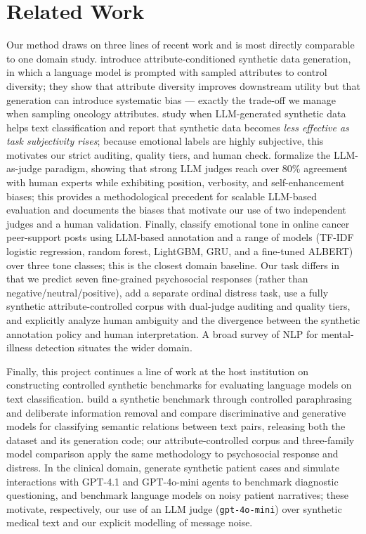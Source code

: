\documentclass[11pt,a4paper]{article}
\begin{document}
\section{Related Work}
Our method draws on three lines of recent work and is most directly comparable to one domain study.
\citet{yu2023} introduce attribute-conditioned synthetic data generation, in which a language model is
prompted with sampled attributes to control diversity; they show that attribute diversity improves
downstream utility but that generation can introduce systematic bias --- exactly the trade-off we
manage when sampling oncology attributes. \citet{li2023} study when LLM-generated synthetic data helps
text classification and report that synthetic data becomes \emph{less effective as task subjectivity
rises}; because emotional labels are highly subjective, this motivates our strict auditing, quality
tiers, and human check. \citet{zheng2023} formalize the LLM-as-judge paradigm, showing that strong LLM
judges reach over 80\% agreement with human experts while exhibiting position, verbosity, and
self-enhancement biases; this provides a methodological precedent for scalable LLM-based evaluation and
documents the biases that motivate our use of two independent judges and a human validation. Finally,
\citet{xu2026} classify emotional tone in online cancer peer-support posts using LLM-based annotation
and a range of models (TF-IDF logistic regression, random forest, LightGBM, GRU, and a fine-tuned
ALBERT) over three tone classes; this is the closest domain baseline. Our task differs in that we
predict seven fine-grained psychosocial responses (rather than negative/neutral/positive), add a
separate ordinal distress task, use a fully synthetic attribute-controlled corpus with dual-judge
auditing and quality tiers, and explicitly analyze human ambiguity and the divergence between the
synthetic annotation policy and human interpretation. A broad survey of NLP for mental-illness
detection \citep{zhang2022} situates the wider domain.

Finally, this project continues a line of work at the host institution on constructing controlled
synthetic benchmarks for evaluating language models on text classification. \citet{apartsin2025str}
build a synthetic benchmark through controlled paraphrasing and deliberate information removal and
compare discriminative and generative models for classifying semantic relations between text pairs,
releasing both the dataset and its generation code; our attribute-controlled corpus and three-family
model comparison apply the same methodology to psychosocial response and distress. In the clinical
domain, \citet{werthaim2026} generate synthetic patient cases and simulate interactions with GPT-4.1
and GPT-4o-mini agents to benchmark diagnostic questioning, and \citet{mama2025} benchmark language
models on noisy patient narratives; these motivate, respectively, our use of an LLM judge
(\texttt{gpt-4o-mini}) over synthetic medical text and our explicit modelling of message noise.
\end{document}
